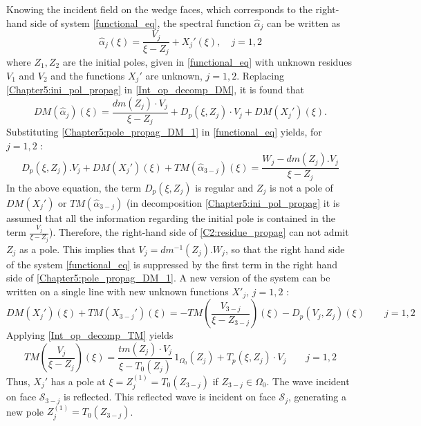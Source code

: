 Knowing the incident field on the wedge faces, which corresponds to the right-hand side of system \eqref{functional_eq}, the spectral function  $\hat{\alpha}_j$ can be written as
\begin{equation}
\label{Chapter5:ini_pol_propag}
\hat{\alpha}_j(\xi) = \dfrac{V_j}{\xi - Z_j} + X_j'(\xi), \quad j=1,2
\end{equation}
where $Z_1,Z_2$ are the initial poles, given in \eqref{functional_eq} with unknown residues $V_1$ and $V_2$ and the functions $X_j'$ are unknown, $j=1,2$. Replacing \eqref{Chapter5:ini_pol_propag} in \eqref{Int_op_decomp_DM}, it is found that
\begin{equation}
\label{Chapter5:pole_propag_DM_1}
DM(\hat{\alpha}_j)(\xi) = \dfrac{dm(Z_j) \cdot V_j}{\xi - Z_j} + D_p(\xi,Z_j)\cdot V_j + DM( X_j')(\xi).
\end{equation}
Substituting \eqref{Chapter5:pole_propag_DM_1} in \eqref{functional_eq} yields, for $j=1,2$ :
\begin{equation}
D_p(\xi,Z_j).V_j+DM(X_j')(\xi)+TM(\hat{\alpha}_{3-j})(\xi)=\dfrac{W_j-dm(Z_j).V_j}{\xi-Z_j}
\label{C2:residue_propag}
\end{equation}
In the above equation, the term $D_p(\xi,Z_j)$ is regular and $Z_j$ is not a pole of $DM(X_j')$ or $TM(\hat{\alpha}_{3-j})$ (in decomposition \eqref{Chapter5:ini_pol_propag} it is assumed that all the information regarding the initial pole is contained in the term $\frac{V_j}{\xi-Z_j}$). Therefore, the right-hand side of \eqref{C2:residue_propag} can not admit $Z_j$ as a pole. This implies that $V_j =  dm^{-1}(Z_j).W_j$, so that the right hand side of the system \eqref{functional_eq} is suppressed by the first term in the right hand side of \eqref{Chapter5:pole_propag_DM_1}. A new version of the system can be written on a single line with new unknown functions $X'_j, \, j=1,2$ :
\begin{equation}
DM  (X_j' )(\xi)+ TM (X_{3-j}' )(\xi) = - TM  \left(  \dfrac{V_{3-j}}{\xi - Z_{3-j}} \right) (\xi)  - D_p(V_j,Z_j)(\xi) \qquad j=1,2
\end{equation}
Applying \eqref{Int_op_decomp_TM} yields
\begin{equation}
\label{Chapter5:pol_propag_step3}
TM  \left(  \dfrac{V_j}{\xi - Z_j} \right)(\xi) = \dfrac{tm(Z_j) \cdot V_j}{\xi - T_0(Z_j)}  \, 1_{\Omega_0}(Z_j) + T_p(\xi,Z_j)\cdot V_j \qquad j=1,2
\end{equation}
Thus, $X_j'$ has a pole at $\xi = Z_j^{(1)} = T_0(Z_{3-j})$ if $Z_{3-j} \in \Omega_0$. The wave incident on face $\mathcal{S}_{3-j}$ is reflected. This reflected wave is incident on face $\mathcal{S}_j$, generating a new pole $Z_j^{(1)}=T_0(Z_{3-j})$. 
